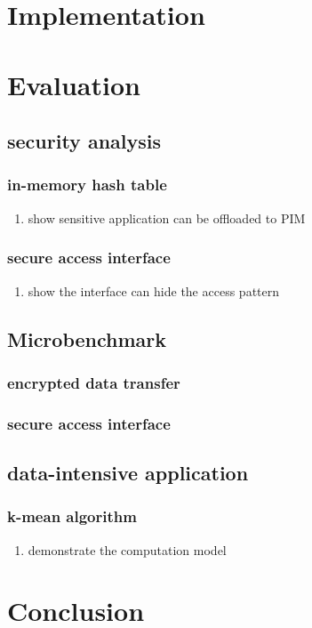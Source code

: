 \documentclass[11pt]{article}
\begin{document}
\section{Implementation}
\label{sec:orgabc2fa3}
\section{Evaluation}
\label{sec:org491c38c}
\subsection{security analysis}
\label{sec:org3c9a81a}
\subsubsection{in-memory hash table}
\label{sec:org011d79c}
\begin{enumerate}
\item show sensitive application can be offloaded to PIM
\label{sec:org92c9fd2}
\end{enumerate}
\subsubsection{secure access interface}
\label{sec:orgdfb2b71}
\begin{enumerate}
\item show the interface can hide the access pattern
\label{sec:org51b2a60}
\end{enumerate}
\subsection{Microbenchmark}
\label{sec:org6d86f05}
\subsubsection{encrypted data transfer}
\label{sec:orge266fd1}
\subsubsection{secure access interface}
\label{sec:org918266b}
\subsection{data-intensive application}
\label{sec:org08b765c}
\subsubsection{k-mean algorithm}
\label{sec:orgaeae79c}
\begin{enumerate}
\item demonstrate the computation model
\label{sec:org7dc22aa}
\end{enumerate}
\section{Conclusion}
\label{sec:orgf69a0f1}
\end{document}
